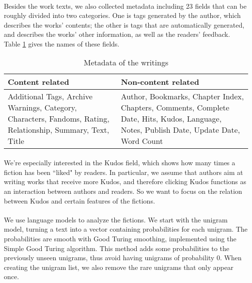 \documentclass[11pt]{article} %
\begin{document}
\paragraph{} Besides the work texts, we also collected metadata including 23 fields that can be roughly divided into two categories. One is tags generated by the author, which describes the works' contents; the other is tags that are automatically generated, and describes the works’ other information, as well as the readers' feedback. Table \ref{tab:metadata} gives the names of these fields. 

\begin{table}[htp]
\caption{Metadata of the writings}
\begin{center}
\begin{tabular}{p{7cm}|p{7cm}}
  \hline			
 Content related & Non-content related\\\hline
Additional Tags, Archive Warnings, Category, Characters, Fandoms, Rating, Relationship, Summary, Text, Title
&  Author, Bookmarks, Chapter Index, Chapters, Comments, Complete Date, Hits, Kudos, Language, Notes, Publish Date, Update Date, Word Count\\
\hline
\end{tabular}
\end{center}
\label{tab:metadata}
\end{table}%

\paragraph{} We're especially interested in the Kudos field, which shows how many times a fiction has been ``liked" by readers. In particular, we assume that authors aim at writing works that receive more Kudos, and therefore clicking Kudos functions as an interaction between authors and readers. So we want to focus on the relation between Kudos and certain features of the fictions.

\paragraph{} We use language models to analyze the fictions. We start with the unigram model, turning a text into a vector containing probabilities for each unigram. The probabilities are smooth with Good Turing smoothing, implemented using the Simple Good Turing algorithm\cite{gales1995good}. This method adds some probabilities to the previously unseen unigrams, thus avoid having unigrams of probability 0. When creating the unigram list, we also remove the rare unigrams that only appear once.
\end{document}
